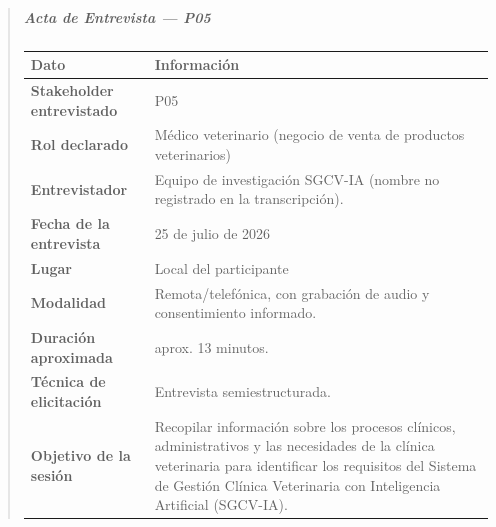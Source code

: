 \documentclass[
]{article}
\newcounter{none} %
\begin{document}
\begin{quote}
\subparagraph{Acta de Entrevista --- P05}\label{acta-entrevista-p05}

{\def\LTcaptype{none} %
\begin{longtable}[]{|
  >{\raggedright\arraybackslash}p{}|
  >{\raggedright\arraybackslash}p{}|}
\hline
\begin{minipage}[b]{\linewidth}\centering
\textbf{Dato}
\end{minipage} & \begin{minipage}[b]{\linewidth}\centering
\textbf{Información}
\end{minipage} \\
\hline
\endhead
\hline
\endlastfoot
\textbf{Stakeholder entrevistado} & \begin{minipage}[t]{\linewidth}\raggedright
P05
\end{minipage} \\
\hline
\textbf{Rol declarado} & \begin{minipage}[t]{\linewidth}\raggedright
Médico veterinario (negocio de venta de productos veterinarios)
\end{minipage} \\
\hline
\textbf{Entrevistador} & \begin{minipage}[t]{\linewidth}\raggedright
Equipo de investigación SGCV-IA (nombre no registrado en la transcripción).
\end{minipage} \\
\hline
\textbf{Fecha de la entrevista} & \begin{minipage}[t]{\linewidth}\raggedright
25 de julio de 2026
\end{minipage} \\
\hline
\textbf{Lugar} & \begin{minipage}[t]{\linewidth}\raggedright
Local del participante
\end{minipage} \\
\hline
\textbf{Modalidad} & \begin{minipage}[t]{\linewidth}\raggedright
Remota/telefónica, con grabación de audio y consentimiento informado.
\end{minipage} \\
\hline
\textbf{Duración aproximada} & \begin{minipage}[t]{\linewidth}\raggedright
aprox. 13 minutos.
\end{minipage} \\
\hline
\textbf{Técnica de elicitación} & \begin{minipage}[t]{\linewidth}\raggedright
Entrevista semiestructurada.
\end{minipage} \\
\hline
\textbf{Objetivo de la sesión} & \begin{minipage}[t]{\linewidth}\raggedright
Recopilar información sobre los procesos clínicos, administrativos y las necesidades de la clínica veterinaria para identificar los requisitos del Sistema de Gestión Clínica Veterinaria con Inteligencia Artificial (SGCV-IA).
\end{minipage} \\
\hline
\end{longtable}
}


\end{quote}
\end{document}
